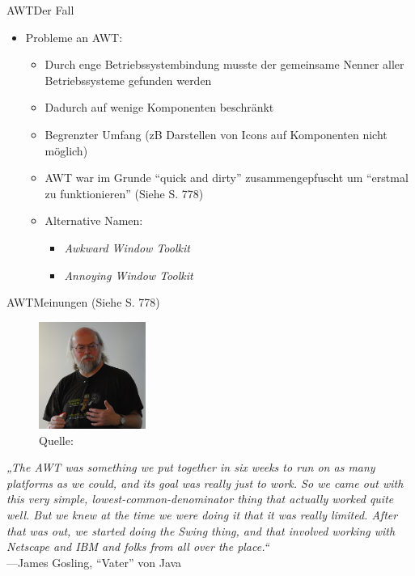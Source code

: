 \begin{frame}{AWT}{Der Fall}
	\begin{itemize}
		\item Probleme an AWT:
		\begin{itemize}
			\item Durch enge Betriebssystembindung musste der gemeinsame Nenner aller Betriebssysteme gefunden werden
			\item Dadurch auf wenige Komponenten beschränkt
			\item Begrenzter Umfang (zB Darstellen von Icons auf Komponenten nicht möglich)
			\item AWT war im Grunde "`quick and dirty"' zusammengepfuscht um "`erstmal zu funktionieren"' (Siehe \cite{ullenboom2014java} S. 778)
			\item Alternative Namen:
			\begin{itemize}
				\item \textit{Awkward Window Toolkit}
				\item \textit{Annoying Window Toolkit}
			\end{itemize}
		\end{itemize}
	\end{itemize}
\end{frame}

\begin{frame}{AWT}{Meinungen (Siehe \cite{ullenboom2018java} S. 778)}
    \begin{minipage}{0.35\textwidth}
            \begin{figure}
                \includegraphics[height=3.5cm]{graph/gosling}
                \caption*{Quelle: \cite{wiki:gosling}}
            \end{figure}
        \end{minipage}
        \hfill
        \begin{minipage}{0.6\textwidth}
            \textit{„The AWT was something we put together in six weeks to run on as many platforms as we could, and its goal was really just to work. 
			So we came out with this very simple, lowest-common-denominator thing that actually worked quite well. 
			But we knew at the time we were doing it that it was really limited. 
			After that was out, we started doing the Swing thing, and that involved working with Netscape and IBM and folks from all over the place.“}
			\\  ---James Gosling, "`Vater"' von Java
        \end{minipage}
\end{frame}

